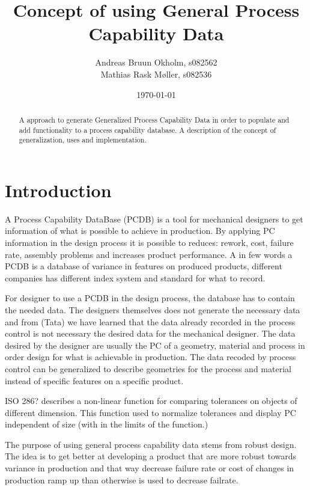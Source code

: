 \documentclass[aip,amsmath, reprint, author-year]{revtex4-1}
\begin{document}
\begin{abstract}
A approach to generate Generalized Process Capability Data in order to populate and add functionality to a process capability database.
A description of the concept of generalization, uses and implementation.
\end{abstract}

\title{Concept of using General Process Capability Data}
\author{Andreas Bruun Okholm, s082562\\
Mathias Rask Møller, s082536 }
 
\date{\today}
\maketitle


\section{Introduction}

A Process Capability DataBase (PCDB) is a tool for mechanical designers to get information of what is possible to achieve in production. By applying PC information in the design process it is possible to reduces: rework, cost, failure rate, assembly problems and increases product performance.
A in few words a PCDB is a database of variance in features on produced products, different companies has different index system and standard for what to record.

For designer to use a PCDB in the design process, the database has to contain the needed data. The designers themselves does not generate the necessary data and from (Tata) we have learned that the data already recorded in the process control is not necessary the desired data for the mechanical designer. The data desired by the designer are usually the PC of a geometry, material and process in order design for what is achievable in production. The data recoded by process control can be generalized to describe geometries for the process and material instead of specific features on a specific product. 

ISO 286? describes a non-linear function for comparing tolerances on objects of different dimension. This function used to normalize tolerances and display PC independent of size (with in the limits of the function.)  



The purpose of using general process capability data stems from robust design. The idea is to get better at developing a product that are more robust towards variance in production and that way decrease failure rate or cost of changes in production ramp up than otherwise is used to decrease failrate.
\end{document}
